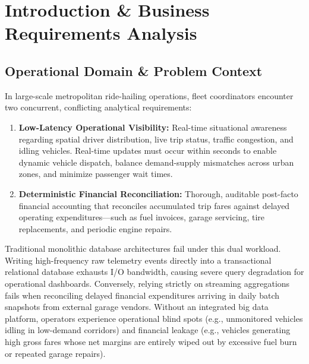 \documentclass[11pt,a4paper]{article}
\begin{document}
\clearpage
\tableofcontents
\clearpage
\listoffigures
\clearpage
\listoftables
\clearpage

\setcounter{page}{1}

\section{Introduction \& Business Requirements Analysis}
\subsection{Operational Domain \& Problem Context}
In large-scale metropolitan ride-hailing operations, fleet coordinators encounter two concurrent, conflicting analytical requirements:
\begin{enumerate}
    \item \textbf{Low-Latency Operational Visibility:} Real-time situational awareness regarding spatial driver distribution, live trip status, traffic congestion, and idling vehicles. Real-time updates must occur within seconds to enable dynamic vehicle dispatch, balance demand-supply mismatches across urban zones, and minimize passenger wait times.
    \item \textbf{Deterministic Financial Reconciliation:} Thorough, auditable post-facto financial accounting that reconciles accumulated trip fares against delayed operating expenditures—such as fuel invoices, garage servicing, tire replacements, and periodic engine repairs.
\end{enumerate}

Traditional monolithic database architectures fail under this dual workload. Writing high-frequency raw telemetry events directly into a transactional relational database exhausts I/O bandwidth, causing severe query degradation for operational dashboards. Conversely, relying strictly on streaming aggregations fails when reconciling delayed financial expenditures arriving in daily batch snapshots from external garage vendors. Without an integrated big data platform, operators experience operational blind spots (e.g., unmonitored vehicles idling in low-demand corridors) and financial leakage (e.g., vehicles generating high gross fares whose net margins are entirely wiped out by excessive fuel burn or repeated garage repairs).
\end{document}
